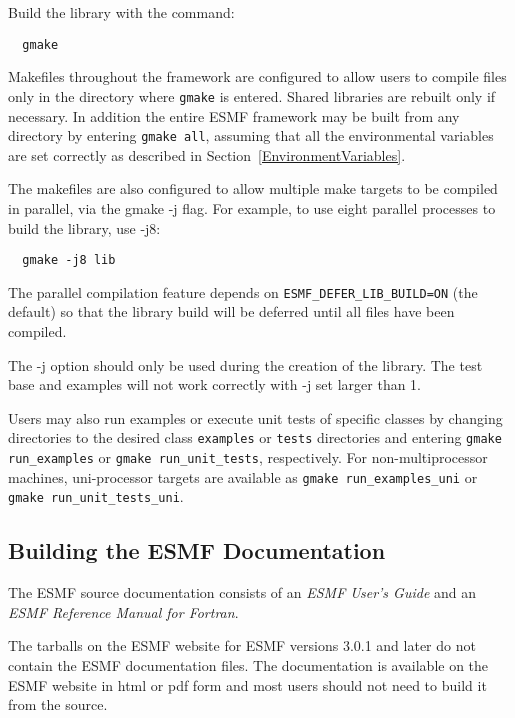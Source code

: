 Build the library with the command:
\begin{verbatim}
  gmake 
\end{verbatim}


Makefiles throughout the framework are configured to allow users to
compile files only in the directory where {\tt gmake} is entered. Shared
libraries are rebuilt only if necessary. In addition the entire ESMF
framework may be built from any directory by entering {\tt gmake all},
assuming that all the environmental variables are set correctly as
described in Section~\ref{EnvironmentVariables}.

The makefiles are also configured to allow multiple make targets to be
compiled in parallel, via the gmake -j flag.  For example, to use eight
parallel processes to build the library, use -j8:
\begin{verbatim}
  gmake -j8 lib
\end{verbatim}

The parallel compilation feature depends on {\tt ESMF\_DEFER\_LIB\_BUILD=ON}
(the default) so that the library build will be deferred until all files
have been compiled.

The -j option should only be used during the creation of the library.
The test base and examples will not work correctly with -j set larger
than 1.

Users may also run examples or execute unit tests of specific classes
by changing directories to the desired class {\tt examples} or {\tt tests} 
directories and entering {\tt gmake run\_examples} or 
{\tt gmake run\_unit\_tests}, respectively.  For non-multiprocessor machines,
uni-processor targets are available as {\tt gmake run\_examples\_uni} or
{\tt gmake run\_unit\_tests\_uni}.

\subsection{Building the ESMF Documentation}
\label{BuildDocumentation}

The ESMF source documentation consists of an {\it ESMF User's Guide}
and an {\it ESMF Reference Manual for Fortran}.

The tarballs on the ESMF website for ESMF versions 3.0.1 and later do
not contain the ESMF documentation files.  The documentation is 
available on the ESMF website in html or pdf form and most users should
not need to build it from the source.

